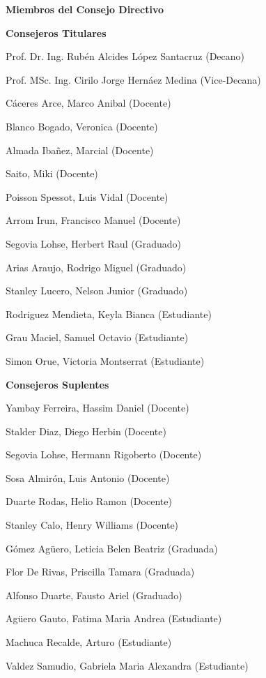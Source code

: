 \begin{center}
\textbf{Miembros del Consejo Directivo}
\end{center}
	\vspace{-5mm}
	
\begin{center}
\textbf{Consejeros Titulares}
\end{center}

Prof. Dr. Ing. Rubén Alcides López Santacruz (Decano)

Prof. MSc. Ing. Cirilo Jorge Hernáez Medina (Vice-Decana)

Cáceres Arce, Marco Anibal (Docente)

Blanco Bogado, Veronica (Docente)

Almada Ibañez, Marcial (Docente)

Saito, Miki (Docente)

Poisson Spessot, Luis Vidal (Docente)

Arrom Irun, Francisco Manuel (Docente)

Segovia Lohse, Herbert Raul (Graduado)

Arias Araujo, Rodrigo Miguel (Graduado)

Stanley Lucero, Nelson Junior (Graduado)

Rodriguez Mendieta, Keyla Bianca (Estudiante)

Grau Maciel, Samuel Octavio (Estudiante)

Simon Orue, Victoria Montserrat (Estudiante)
	
	\vspace{5mm}
	
 
 \begin{center}
	\textbf{Consejeros Suplentes }
 \end{center}
	
 Yambay Ferreira, Hassim Daniel (Docente)

 Stalder Diaz, Diego Herbin (Docente)

 Segovia Lohse, Hermann Rigoberto (Docente)

 Sosa Almirón, Luis Antonio (Docente)

 Duarte Rodas, Helio Ramon (Docente)

 Stanley Calo, Henry Williams (Docente)

 Gómez Agüero, Leticia Belen Beatriz (Graduada)

 Flor De Rivas, Priscilla Tamara (Graduada)

 Alfonso Duarte, Fausto Ariel (Graduado)

 Agüero Gauto, Fatima Maria Andrea (Estudiante)

 Machuca Recalde, Arturo (Estudiante)
 
 Valdez Samudio, Gabriela Maria Alexandra (Estudiante)

	